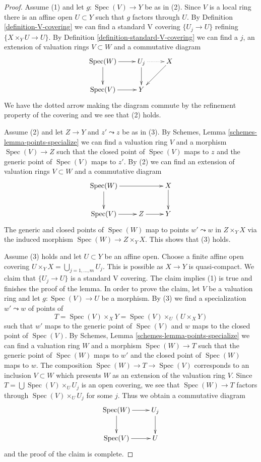 \documentclass{stacks-project}
\theoremstyle{plain}
\theoremstyle{definition}
\theoremstyle{remark}
\numberwithin{equation}{subsection}
\def\Spec{\mathop{\mathrm{Spec}}}
\begin{document}
\begin{proof}
Assume (1) and let $g : \Spec(V) \to Y$ be as in (2).
Since $V$ is a local ring there is an affine open $U \subset Y$
such that $g$ factors through $U$. By Definition \ref{definition-V-covering}
we can find a standard V covering $\{U_j \to U\}$ refining
$\{X \times_Y U \to U\}$. By Definition \ref{definition-standard-V-covering}
we can find a $j$, an extension of valuation rings $V \subset W$
and a commutative diagram
$$
\xymatrix{
\Spec(W) \ar[r] \ar[d] & U_j \ar[d] \ar@{..>}[r] & X \ar[ld] \\
\Spec(V) \ar[r] & Y
}
$$
We have the dotted arrow making the diagram commute by the refinement
property of the covering and we see that (2) holds.

\medskip\noindent
Assume (2) and let $Z \to Y$ and $z' \leadsto z$ be as in (3).
By Schemes, Lemma \ref{schemes-lemma-points-specialize}
we can find a valuation ring $V$ and a morphism $\Spec(V) \to Z$
such that the closed point of $\Spec(V)$ maps to $z$ and the
generic point of $\Spec(V)$ maps to $z'$. By (2) we can find an
extension of valuation rings $V \subset W$ and a
commutative diagram
$$
\xymatrix{
\Spec(W) \ar[rr] \ar[d] & & X \ar[d] \\
\Spec(V) \ar[r] & Z \ar[r] & Y
}
$$
The generic and closed points of $\Spec(W)$ map to points
$w' \leadsto w$ in $Z \times_Y X$ via the
induced morphism $\Spec(W) \to Z \times_Y X$.
This shows that (3) holds.

\medskip\noindent
Assume (3) holds and let $U \subset Y$ be an affine open.
Choose a finite affine open covering
$U \times_Y X = \bigcup_{j = 1, \ldots, m} U_j$.
This is possible as $X \to Y$ is quasi-compact.
We claim that $\{U_j \to U\}$ is a standard V covering.
The claim implies (1) is true and finishes the proof of the lemma.
In order to prove the claim, let $V$ be a valuation ring
and let $g : \Spec(V) \to U$ be a morphism.
By (3) we find a specialization $w' \leadsto w$ of
points of
$$
T = \Spec(V) \times_X Y = \Spec(V) \times_U (U \times_X Y)
$$
such that $w'$ maps to the generic point of $\Spec(V)$
and $w$ maps to the closed point of $\Spec(V)$.
By Schemes, Lemma \ref{schemes-lemma-points-specialize}
we can find a valuation ring $W$ and a morphism
$\Spec(W) \to T$ such that the generic point of $\Spec(W)$
maps to $w'$ and the closed point of $\Spec(W)$ maps to $w$.
The composition $\Spec(W) \to T \to \Spec(V)$ corresponds
to an inclusion $V \subset W$ which presents $W$ as an
extension of the valuation ring $V$.
Since $T = \bigcup \Spec(V) \times_U U_j$ is an open
covering, we see that $\Spec(W) \to T$ factors through
$\Spec(V) \times_U U_j$ for some $j$. Thus we obtain
a commutative diagram
$$
\xymatrix{
\Spec(W) \ar[d] \ar[r] & U_j \ar[d] \\
\Spec(V) \ar[r] & U
}
$$
and the proof of the claim is complete.
\end{proof}
\end{document}
